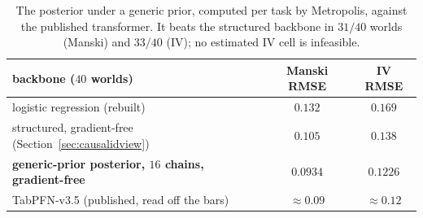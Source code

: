 \documentclass[11pt]{article}
\theoremstyle{definition}
\theoremstyle{remark}
\newcommand{\bayesM}{0.0934}\newcommand{\bayesIV}{0.1226}\newcommand{\bayesCH}{16}\newcommand{\bayesWM}{31}\newcommand{\bayesWIV}{33}
\begin{document}
\begin{table}[!htbp]\centering\small
\begin{tabular}{lcc}
\toprule
backbone ($40$ worlds) & Manski RMSE & IV RMSE\\
\midrule
logistic regression (rebuilt) & $0.132$ & $0.169$\\
structured, gradient-free (Section~\ref{sec:causalidview}) & $0.105$ & $0.138$\\
\textbf{generic-prior posterior, $\bayesCH$ chains, gradient-free} & $\mathbf{\bayesM}$ & $\mathbf{\bayesIV}$\\
TabPFN-v3.5 (published, read off the bars) & $\approx0.09$ & $\approx0.12$\\
\bottomrule
\end{tabular}
\caption{The posterior under a generic prior, computed per task by Metropolis, against the published transformer. It beats the structured backbone in $\bayesWM/40$ worlds (Manski) and $\bayesWIV/40$ (IV); no estimated IV cell is infeasible.}\label{tab:bayesprior}
\end{table}
\end{document}
